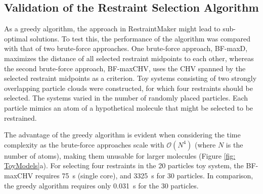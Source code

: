 
\subsection{Validation of the Restraint Selection Algorithm}
As a greedy algorithm, the approach in RestraintMaker might lead to sub-optimal solutions. To test this, the performance of the algorithm was compared with that of two brute-force approaches. One brute-force approach, BF-maxD, maximizes the distance of all selected restraint midpoints to each other, whereas the second brute-force approach, BF-maxCHV, uses the CHV spanned by the selected restraint midpoints as a criterion. Toy systems consisting  of two strongly overlapping particle clouds were constructed, for which four restraints should be selected. The systems varied in the number of randomly placed particles. Each particle mimics an atom of a hypothetical molecule that might be selected to be restrained.

The advantage of the greedy algorithm is evident when considering the time complexity as the brute-force approaches scale with $\mathcal O(N^4)$ (where $N$ is the number of atoms), making them unusable for larger molecules (Figure \ref{fig: ToyModels}a). For selecting four restraints in the 20 particles toy system, the BF-maxCHV requires 75~s (single core), and 3325~s for 30 particles. In comparison, the greedy algorithm requires only 0.031~s for the 30 particles.

